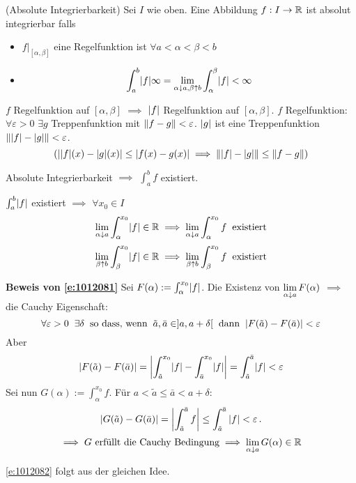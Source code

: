\begin{Def}{(Absolute Integrierbarkeit)}
Sei $I$ wie oben. Eine Abbildung $f:I\to\mathbb{R}$  ist absolut integrierbar falls
  \begin{itemize}
    \item $f|_{[\alpha,\beta]}$ eine Regelfunktion ist $\forall a<\alpha<\beta<b$
    \item 
      \[\int_a^b\mathopen| f \mathclose|\infty =\lim_{\alpha\downarrow a, \beta\uparrow b} \int_\alpha^\beta\mathopen| f \mathclose|
<\infty\]
  \end{itemize}
\end{Def}
\begin{Bem}
  $f$ Regelfunktion auf $[\alpha,\beta]$ $\implies$ $\mathopen| f \mathclose|$ Regelfunktion auf $[\alpha,\beta]$. $f$ Regelfunktion: $\forall \varepsilon>0$ $\exists g$ Treppenfunktion mit $\left\| f-g \right\|<\varepsilon$. $\mathopen| g \mathclose|$ ist eine Treppenfunktion $\left\| \mathopen| f \mathclose|-\mathopen| g \mathclose| \right\|<\varepsilon$.
  \[\left( \mathopen| \mathopen| f \mathclose|(x)-\mathopen| g \mathclose|(x) \mathclose|\leq\mathopen| f(x)-g(x) \mathclose|\implies \left\| \mathopen| f \mathclose|-\mathopen| g \mathclose| \right\|\leq\left\| f-g \right\| \right)\]
\end{Bem}
\begin{Sat}
  Absolute Integrierbarkeit $\implies$ $\int_a^b f$ existiert.
\end{Sat}
\begin{Bew}
  $\int_a^b\mathopen| f \mathclose|$ existiert $\implies$ $\forall x_0\in I$
  \begin{equation}\label{e:1012081}
    \displaystyle\lim_{\alpha\downarrow a}\int_\alpha^{x_0}\mathopen| f \mathclose|\in\mathbb{R}\implies\displaystyle\lim_{\alpha\downarrow a}
\int_\alpha^{x_0}f\hspace{2mm}\text{existiert}
  \end{equation}
  \begin{equation}\label{e:1012082}
    \displaystyle\lim_{\beta\uparrow b}\int_\beta^{x_0}\mathopen| f \mathclose|\in\mathbb{R}\implies\displaystyle\lim_{\beta\uparrow b}\int_\beta^{x_0}f\hspace{2mm}\text{existiert}
  \end{equation}

\medskip

{\bf Beweis von \eqref{e:1012081}} Sei $F(\alpha):=\int_\alpha^{x_0}\mathopen| f \mathclose|$. Die
Existenz von $\displaystyle\lim_{\alpha\downarrow a} F(\alpha)$ $\implies$ die Cauchy Eigenschaft:
  \[\forall \varepsilon>0\hspace{2mm}\exists\delta\hspace{2mm}\text{so dass, wenn}\hspace{2mm}\tilde a,\bar a\in]a,a+\delta[\hspace{2mm}\text{dann}\hspace{2mm}\mathopen| F(\tilde a)-F(\bar a) \mathclose| < \varepsilon\]
Aber
  \[|F(\tilde a) - F(\bar a)| = \left|\int_{\tilde{a}}^{x_0}\mathopen| f \mathclose|-\int_{\bar{a}}^{x_0} \mathopen| f \mathclose|\right|
=\int_{\tilde{a}}^{\bar{a}}\mathopen| f \mathclose|<\varepsilon\]
Sei nun $G(\alpha):=\int_\alpha^{x_0}f$. F\"ur  $a<\tilde{a}\leq \bar{a}<a+\delta$:
\[
|G(\tilde a)- G (\bar a)|= \left|\int_{\tilde a}^{\bar a} f\right|
\leq \int_{\tilde a}^{\bar a} |f| <\varepsilon\, .
\]
\[\implies \text{$G$ erf\"ullt die Cauchy Bedingung}
\implies \displaystyle\lim_{\alpha\downarrow a}G(\alpha)\in\mathbb{R}\]

\medskip

\eqref{e:1012082} folgt aus der gleichen Idee.
\end{Bew}

